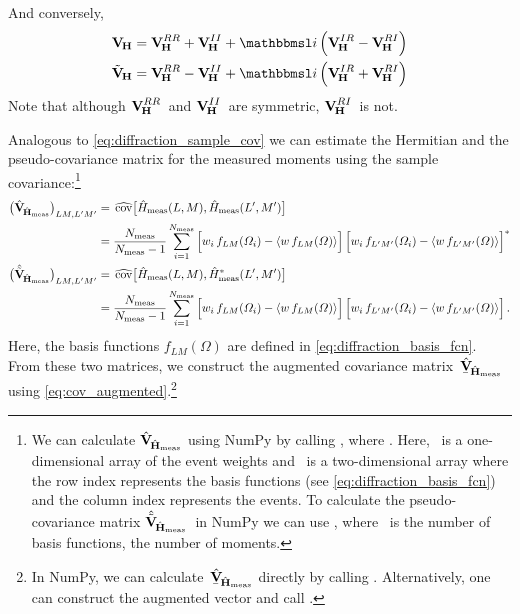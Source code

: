 And conversely,
\begin{align}
  \covMatSym_{\!\vect{H}}
  = \covMatSym_{\!\vect{H}}^{RR} + \covMatSym_{\!\vect{H}}^{II} + \imag \rBrk{\covMatSym_{\!\vect{H}}^{IR} - \covMatSym_{\!\vect{H}}^{RI}}
  \\
  \tilde{\covMatSym}_{\!\vect{H}}
  = \covMatSym_{\!\vect{H}}^{RR} - \covMatSym_{\!\vect{H}}^{II} + \imag \rBrk{\covMatSym_{\!\vect{H}}^{IR} + \covMatSym_{\!\vect{H}}^{RI}}
\end{align}
Note that although $\bm{\mathrm{V}}_{\!\bm{\mathrm{H}}}^{RR}$~and
$\bm{\mathrm{V}}_{\!\bm{\mathrm{H}}}^{II}$~are symmetric,
$\bm{\mathrm{V}}_{\!\bm{\mathrm{H}}}^{RI}$~is not.

Analogous to \cref{eq:diffraction_sample_cov} we can estimate the
Hermitian and the pseudo-covariance matrix for the measured moments
using the sample covariance:\footnote{We can calculate
$\hat{\bm{\mathrm{V}}}_{\!\hat{\bm{\mathrm{H}}}_\text{meas}}$ using NumPy by calling
, where .  Here, ~is a one-dimensional array of the event
weights and ~is a two-dimensional array where the row
index represents the basis functions (see
\cref{eq:diffraction_basis_fcn}) and the column index represents the
events.  To calculate the pseudo-covariance matrix
$\hat{\tilde{\bm{\mathrm{V}}}}_{\!\hat{\bm{\mathrm{H}}}_\text{meas}}$~in NumPy we
can use , where ~is the number
of basis functions, \ie the number of moments.}
\begin{align}
  \rBrk[1]{\covMatEstSym_{\!\hat{\vect{H}}_\text{meas}}}_{L M, L' M'}
  ={}& \covEst[1]{\hat{H}_\text{meas}(L, M), \hat{H}_\text{meas}(L', M')} \nonumber
  \\
  \label{eq:diffraction_sample_cov_hermit_meas}
  ={}& \frac{N_\text{meas}}{N_\text{meas} - 1} \sum_{i = 1}^{N_\text{meas}}
  \sBrk[2]{w_i\, f_{L M}(\Omega_i) - \mean{w\, f_{L M}(\Omega)}} \sBrk[2]{w_i\, f_{L' M'}(\Omega_i) - \mean{w\, f_{L' M'}(\Omega)}}^*
  \\
  \rBrk[1]{\hat{\tilde{\covMatSym}}_{\!\hat{\vect{H}}_\text{meas}}}_{L M, L' M'}
  ={}& \covEst[1]{\hat{H}_\text{meas}(L, M), \hat{H}_\text{meas}^*(L', M')} \nonumber
  \\
  \label{eq:diffraction_sample_cov_pseudo_meas}
  ={}& \frac{N_\text{meas}}{N_\text{meas} - 1} \sum_{i = 1}^{N_\text{meas}}
  \sBrk[2]{w_i\, f_{L M}(\Omega_i) - \mean{w\, f_{L M}(\Omega)}} \sBrk[2]{w_i\, f_{L' M'}(\Omega_i) - \mean{w\, f_{L' M'}(\Omega)}}.
\end{align}
Here, the basis functions $f_{L M}(\Omega)$ are defined in
\cref{eq:diffraction_basis_fcn}.  From these two matrices, we
construct the augmented covariance
matrix~$\hat{\underaccent{\bar}{\covMatSym}}_{\!\hat{\vect{H}}_\text{meas}}$
using \cref{eq:cov_augmented}.\footnote{\label{fn:cov_aug_numpy}In
NumPy, we can
calculate~$\hat{\underaccent{\bar}{\covMatSym}}_{\!\hat{\vect{H}}_\text{meas}}$
directly by calling .  Alternatively, one can construct the
augmented vector  and call .}

